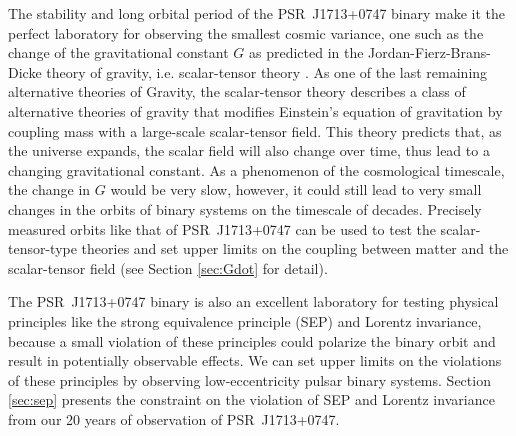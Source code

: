 The stability and long orbital period of the PSR~J1713+0747 binary make it the
perfect laboratory for observing the smallest cosmic variance, one such as the
change of the gravitational constant $G$ as predicted in the Jordan-Fierz-Brans-Dicke
theory of gravity, i.e. scalar-tensor theory \citep{jor59,fie56,bd61}. 
As one of the last remaining alternative theories of Gravity, the
scalar-tensor theory describes a class of alternative theories of gravity
that modifies Einstein's equation of gravitation by coupling mass with a large-scale scalar-tensor field.
This theory predicts that, as the universe expands, the scalar field will
also change over time, thus lead to a changing gravitational constant. 
As a phenomenon of the cosmological timescale, the change in $G$ would be very slow, however, it could still lead to very small
changes in the orbits of binary systems on the timescale of decades. 
Precisely measured orbits like that of PSR~J1713+0747 can be used to test the scalar-tensor-type theories and set upper limits on the coupling between matter and the scalar-tensor field (see Section \ref{sec:Gdot} for detail). 

The PSR~J1713+0747 binary is also an excellent laboratory for testing physical 
principles like the strong equivalence principle (SEP) and Lorentz invariance,
because a small violation of these principles could polarize the
binary orbit and result in potentially observable effects. We can set
upper limits on the violations of these principles by observing
low-eccentricity pulsar binary systems. Section \ref{sec:sep} presents the constraint on the violation of SEP and Lorentz invariance from our 20 years of observation of PSR~J1713+0747.

